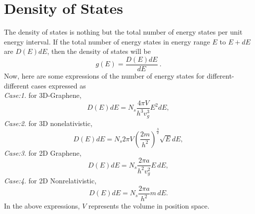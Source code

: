 \documentclass[%
 reprint,
 amsmath,amssymb,
 aps,
]{revtex4-2}
\begin{document}
    \section{Density of States}
    \label{App_A}
    The density of states is nothing but the total number of energy states per unit energy interval. If the total number of energy states in energy range $E$ to $E + dE$ are $D\left(E\right)dE$, then the density of states will be 
    \begin{equation}
    g\left(E\right) = \frac{D\left(E\right)dE}{dE}~.
    \end{equation}
    Now, here are some expressions of the number of energy states for different-different cases expressed as
    \hfill \break
\\
    {\it Case:1.} for 3D-Graphene,
    \begin{equation}
    D\left(E\right)dE = N_s \frac{4\pi V}{h^3 v_g^3}E^2 dE,
    \end{equation}
    {\it Case:2.} for 3D nonelativistic,
    \begin{equation}
     D\left(E\right)dE = N_s 2\pi V \left(\frac{2m}{h^2}\right)^{\frac{3}{2}}\sqrt{E} dE,
    \end{equation}
    {\it Case:3.} for 2D Graphene,
    \begin{equation}
    D\left(E\right)dE = N_s \frac{2\pi a}{h^2 v_g^2} E \, dE,
    \end{equation}
    {\it Case:4.} for 2D Nonrelativistic,
    \begin{equation}
     D\left(E\right)dE = N_s \frac{2\pi a}{h^2} m\, dE.
    \end{equation}
    In the above expressions, $V$ represents the volume in position space.

\end{document}

